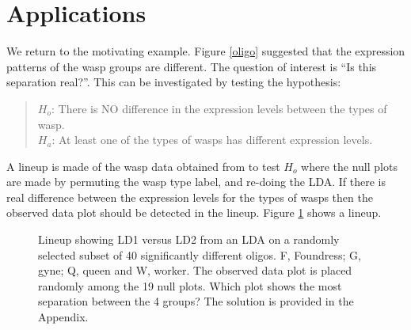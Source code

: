 \section{Applications}

We return to the motivating example. Figure \ref{oligo} suggested that the expression patterns of the wasp groups are different.  The question of interest is ``Is this separation real?''. This can be investigated by testing the hypothesis: 

\begin{quote}
$H_o$: There is NO difference in the expression levels between the types of wasp.\\
$H_a$: At least one of the types of wasps has different expression levels.
\end{quote}
A lineup is made of the wasp data obtained from \cite{toth:2010} to test $H_o$ where the null plots are made by permuting the wasp type label, and re-doing the LDA. If there is real difference between the expression levels for the types of wasps then the observed data plot should be detected in the lineup. Figure \ref{toth_lineup} shows a lineup. 

\begin{figure}[hbtp]
   \centering
       \caption{Lineup showing LD1 versus LD2 from an LDA on a randomly selected subset of 40 significantly different oligos. F, Foundress; G, gyne; Q, queen and W, worker. The observed data plot is placed randomly among the 19 null plots. Which plot shows the most separation between the 4 groups? The solution is provided in the Appendix.}
       \label{toth_lineup}
\end{figure} 


